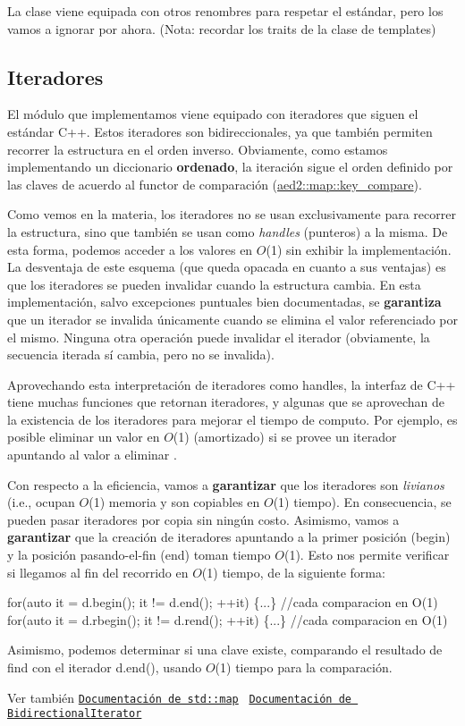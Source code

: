 La clase viene equipada con otros renombres para respetar el estándar, pero los vamos a ignorar por ahora. (Nota\+: recordar los traits de la clase de templates)\hypertarget{Interfaz_Iteradores}{}\subsection{Iteradores}\label{Interfaz_Iteradores}
El módulo que implementamos viene equipado con iteradores que siguen el estándar C++. Estos iteradores son bidireccionales, ya que también permiten recorrer la estructura en el orden inverso. Obviamente, como estamos implementando un diccionario {\bfseries ordenado}, la iteración sigue el orden definido por las claves de acuerdo al functor de comparación (\hyperlink{classaed2_1_1map_a3efa081d3379ab76f33a5ef9fe697523_a3efa081d3379ab76f33a5ef9fe697523}{aed2\+::map\+::key\+\_\+compare}).

Como vemos en la materia, los iteradores no se usan exclusivamente para recorrer la estructura, sino que también se usan como {\itshape handles} (punteros) a la misma. De esta forma, podemos acceder a los valores en $O$(1) sin exhibir la implementación. La desventaja de este esquema (que queda opacada en cuanto a sus ventajas) es que los iteradores se pueden invalidar cuando la estructura cambia. En esta implementación, salvo excepciones puntuales bien documentadas, se {\bfseries garantiza} que un iterador se invalida únicamente cuando se elimina el valor referenciado por el mismo. Ninguna otra operación puede invalidar el iterador (obviamente, la secuencia iterada sí cambia, pero no se invalida).

Aprovechando esta interpretación de iteradores como handles, la interfaz de C++ tiene muchas funciones que retornan iteradores, y algunas que se aprovechan de la existencia de los iteradores para mejorar el tiempo de computo. Por ejemplo, es posible eliminar un valor en $O$(1) (amortizado) si se provee un iterador apuntando al valor a eliminar \cite{MehlhornSanders2008}.

Con respecto a la eficiencia, vamos a {\bfseries garantizar} que los iteradores son {\itshape livianos} (i.\+e., ocupan $O$(1) memoria y son copiables en $O$(1) tiempo). En consecuencia, se pueden pasar iteradores por copia sin ningún costo. Asimismo, vamos a {\bfseries garantizar} que la creación de iteradores apuntando a la primer posición ({\ttfamily begin}) y la posición pasando-\/el-\/fin ({\ttfamily end}) toman tiempo $O$(1). Esto nos permite verificar si llegamos al fin del recorrido en $O$(1) tiempo, de la siguiente forma\+: 
\begin{DoxyCode}
\textcolor{keywordflow}{for}(\textcolor{keyword}{auto} it = d.begin(); it != d.end(); ++it) \{...\}   \textcolor{comment}{//cada comparacion en}
O(1)
for(auto it = d.rbegin(); it != d.rend(); ++it) \{...\} \textcolor{comment}{//cada comparacion en}
O(1)
\end{DoxyCode}
 Asimismo, podemos determinar si una clave existe, comparando el resultado de {\ttfamily find} con el iterador {\ttfamily d.\+end()}, usando $O$(1) tiempo para la comparación.

\begin{DoxySeeAlso}{Ver también}
\href{http://en.cppreference.com/w/cpp/container/map}{\tt Documentación de std\+::map}~\newline
 \href{http://en.cppreference.com/w/cpp/concept/BidirectionalIterator}{\tt Documentación de Bidirectional\+Iterator} 
\end{DoxySeeAlso}
